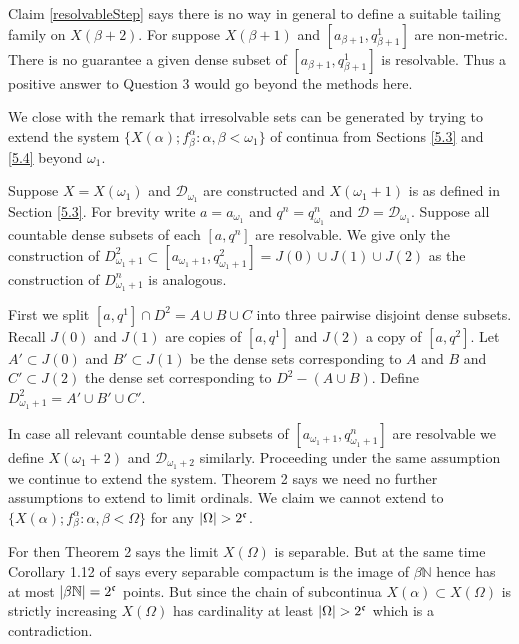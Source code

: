 \documentclass[12pt]{article}
\theoremstyle{plain}
\theoremstyle{definition}
\newtheorem{definition}[theorem]{Definition}
\newcounter{claim5counter}
\newcommand{\A}{\ensuremath{\alpha}}
\newcommand{\B}{\ensuremath{\beta}}
\newcommand{\W}{\ensuremath{\omega}}
\newcommand{\WW}{\ensuremath{\Omega}}
\newcommand{\NN}{\ensuremath{\mathbb N}}
\newcommand{\0}{\ensuremath{\varnothing}}
\newcommand{\cD}{\ensuremath{\mathcal D}}
\newcommand{\cn}{\ensuremath{\frak c}}
\begin{document}
	Claim \ref{resolvableStep} says there is no way in general to define a suitable tailing family on $X(\B+2)$.
	For suppose $X(\B+1)$ and $[a_{\B+1}, q_{\B+1}^1]$ are non-metric.
	There is no guarantee a given dense subset of $[a_{\B+1}, q_{\B+1}^1]$ is resolvable.
	Thus a positive answer to Question 3 would go beyond the methods here.
	
	We close with the remark that irresolvable sets can be generated by trying to extend
	the system $\{X(\A);f^\A_\B: \A,\B< \W_1\}$ of continua from Sections \ref{5.3} and \ref{5.4} beyond $\W_1$.
	
	Suppose $X = X(\W_1)$ and $\cD_{\W_1}$ are constructed and $X(\W_1+1)$ is as defined in Section \ref{5.3}.
	For brevity write $a = a_{\W_1}$ and $q^n = q^n_{\W_1}$ and $\cD = \cD_{\W_1}$.
	Suppose all countable dense subsets of each $[a, q^n]$ are resolvable.
	We give only the construction of $D_{\W_1+1}^2 \subset [a_{\W_1+1}, q^2_{\W_1+1}] = J(0) \cup J(1) \cup J(2)$
	as the construction of $D_{\W_1+1}^n$ is analogous.
	
	First we split $[a, q^1] \cap D^2 = A \cup B \cup C$ into three pairwise disjoint dense subsets.
	Recall $J(0)$ and $J(1)$ are copies of $[a, q^1]$ and $J(2)$ a copy of $[a, q^2]$.
	Let $A' \subset J(0)$ and $B' \subset J(1)$ be the dense sets corresponding to $A$ and $B$ and
	\mbox{$C' \subset J(2)$} the dense set corresponding to $D^2 - (A \cup B)$.
	Define $D_{\W_1+1}^2 = A' \cup B' \cup C'$. 
	
	
	
	In case all relevant countable dense subsets of $[a_{\W_1+1}, q^n_{\W_1+1}]$ are resolvable 
	we define $X(\W_1+2)$ and $\cD_{\W_1+2}$ similarly.
	Proceeding under the same assumption we continue to extend the system.
	Theorem 2 says we need no further assumptions to extend to limit ordinals.
	We claim we cannot extend to $\{X(\A); f^\A_\B: \A,\B< \WW\}$ for any $|\WW| > 2^\cn$.
	
	For then Theorem 2 says the limit $X(\WW)$ is separable.
	But at the same time Corollary 1.12 of \cite{CSbook} says every separable compactum is the image of $\B \NN$ hence has at most $|\B \NN| = 2^\cn$ points.
	But since the chain of subcontinua $X(\A) \subset X(\WW)$ is strictly increasing 
	$X(\WW)$ has cardinality at least $|\WW| > 2^\cn$ which is a contradiction.
	
\end{document}
